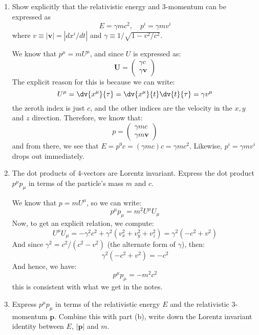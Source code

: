 \documentclass[10pt]{article}
\begin{document}
	\begin{enumerate}[label=(\alph*)]
		\item Show explicitly that the relativistic energy and 3-momentum can be expressed as
			\[
				E = \gamma mc^2, \quad p^{i} = \gamma mv^{i}
			\]
			where \( v \equiv |\mathbf{v}| = |dx^{i} / dt| \) and \( \gamma \equiv 1 / \sqrt{1 - v^2 / c^2} \). 

			\begin{solution}
				We know that \( p^{\mu} = mU^{\mu} \), and since \( U \) is expressed as:
				\[
					\mathbf{U} = \begin{pmatrix} \gamma c \\ \gamma \mathbf{v} \end{pmatrix}
				\]
				The explicit reason for this is because we can write:
				\[
					U^{\mu} = \dv{x^{\mu}}{\tau} = \dv{x^{\mu}}{t}\dv{t}{\tau}  = \gamma v^{\mu}
				\]
				the zeroth index is just \( c \), and the other indices are the velocity in the \( x, y \)
				and
				\( z \) direction. Therefore, we know that:
				\[
					p = \begin{pmatrix} \gamma mc \\ \gamma m \mathbf{v} \end{pmatrix}
				\]
				and from there, we see that \( E = p^{0}c = (\gamma mc) c = \gamma mc^2 \). Likewise, \(
				p^{i} = \gamma m v^{i} \) drops out immediately. 
			\end{solution}
		\item The dot products of 4-vectors are Lorentz invariant. Express the dot product \( p^{\mu}p_\mu \)
			in terms of the particle's mass \( m \) and \( c \). 

			\begin{solution}
				We know that \( p = mU^{\mu} \), so we can write:
				\[
					p^{\mu}p_{\mu} = m^2 U^{\mu}U_{\mu}
				\]
				Now, to get an explicit relation, we compute:
				\[
					U^{\mu}U_{\mu} = -\gamma^2 c^2 + \gamma^2 (v_x^2 + v_y^2 + v_z^2) = \gamma^2(-c^2 + v^2)
				\]
				And since \( \gamma^2 = c^2 /(c^2 - v^2) \) (the alternate form of \( \gamma \)), then:
				\[
					\gamma^2 (-c^2 + v^2) = -c^2
				\]
				And hence, we have:
				\[
					p^{\mu}p_{\mu} = -m^2 c^2
				\]
				this is consistent with what we get in the notes. 
			\end{solution}
		\item Express \( p^{\mu}p_\mu \) in terms of the relativistic energy \( E \) and the relativistic
			3-momentum \( \mathbf{p} \). Combine this with part (b), write down the Lorentz invariant
			identity between \( E \), \( |\mathbf{p}| \) and \( m \). 


\end{enumerate}
\end{document}
